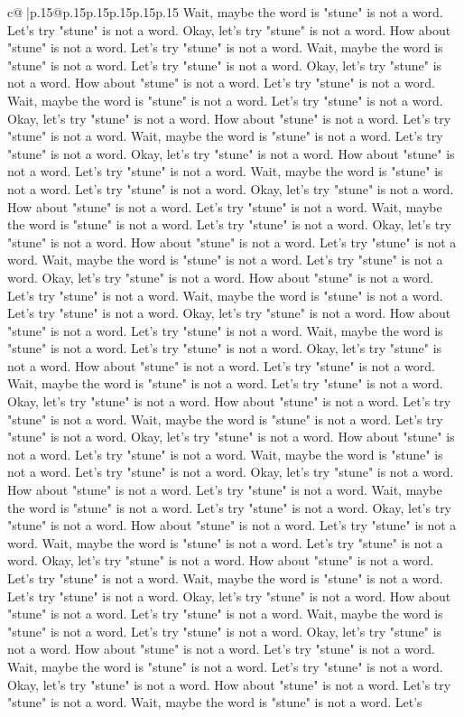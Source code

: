 \documentclass{article}
\begin{document}
{\begin{supertabular}{c@{$\;$}|p{.15\linewidth}@{}p{.15\linewidth}p{.15\linewidth}p{.15\linewidth}p{.15\linewidth}p{.15\linewidth}}
{{{Wait, maybe the word is "stune" is not a word. Let's try "stune" is not a word. Okay, let's try "stune" is not a word. How about "stune" is not a word. Let's try "stune" is not a word. Wait, maybe the word is "stune" is not a word. Let's try "stune" is not a word. Okay, let's try "stune" is not a word. How about "stune" is not a word. Let's try "stune" is not a word. Wait, maybe the word is "stune" is not a word. Let's try "stune" is not a word. Okay, let's try "stune" is not a word. How about "stune" is not a word. Let's try "stune" is not a word. Wait, maybe the word is "stune" is not a word. Let's try "stune" is not a word. Okay, let's try "stune" is not a word. How about "stune" is not a word. Let's try "stune" is not a word. Wait, maybe the word is "stune" is not a word. Let's try "stune" is not a word. Okay, let's try "stune" is not a word. How about "stune" is not a word. Let's try "stune" is not a word. Wait, maybe the word is "stune" is not a word. Let's try "stune" is not a word. Okay, let's try "stune" is not a word. How about "stune" is not a word. Let's try "stune" is not a word. Wait, maybe the word is "stune" is not a word. Let's try "stune" is not a word. Okay, let's try "stune" is not a word. How about "stune" is not a word. Let's try "stune" is not a word. Wait, maybe the word is "stune" is not a word. Let's try "stune" is not a word. Okay, let's try "stune" is not a word. How about "stune" is not a word. Let's try "stune" is not a word. Wait, maybe the word is "stune" is not a word. Let's try "stune" is not a word. Okay, let's try "stune" is not a word. How about "stune" is not a word. Let's try "stune" is not a word. Wait, maybe the word is "stune" is not a word. Let's try "stune" is not a word. Okay, let's try "stune" is not a word. How about "stune" is not a word. Let's try "stune" is not a word. Wait, maybe the word is "stune" is not a word. Let's try "stune" is not a word. Okay, let's try "stune" is not a word. How about "stune" is not a word. Let's try "stune" is not a word. Wait, maybe the word is "stune" is not a word. Let's try "stune" is not a word. Okay, let's try "stune" is not a word. How about "stune" is not a word. Let's try "stune" is not a word. Wait, maybe the word is "stune" is not a word. Let's try "stune" is not a word. Okay, let's try "stune" is not a word. How about "stune" is not a word. Let's try "stune" is not a word. Wait, maybe the word is "stune" is not a word. Let's try "stune" is not a word. Okay, let's try "stune" is not a word. How about "stune" is not a word. Let's try "stune" is not a word. Wait, maybe the word is "stune" is not a word. Let's try "stune" is not a word. Okay, let's try "stune" is not a word. How about "stune" is not a word. Let's try "stune" is not a word. Wait, maybe the word is "stune" is not a word. Let's try "stune" is not a word. Okay, let's try "stune" is not a word. How about "stune" is not a word. Let's try "stune" is not a word. Wait, maybe the word is "stune" is not a word. Let's try "stune" is not a word. Okay, let's try "stune" is not a word. How about "stune" is not a word. Let's try "stune" is not a word. Wait, maybe the word is "stune" is not a word. Let's }}}
\end{supertabular}}
\end{document}
